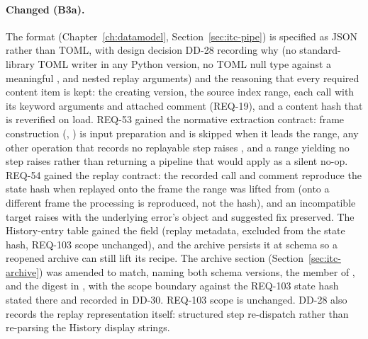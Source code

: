 \paragraph{Changed (B3a).} The  format
(Chapter~\ref{ch:datamodel}, Section~\ref{sec:itc-pipe}) is specified as JSON rather
than TOML, with design decision DD-28 recording why (no
standard-library TOML writer in any Python version, no TOML null type
against a meaningful , and nested replay
arguments) and the reasoning that every required content item is kept:
the creating version, the source index range, each call with its
keyword arguments and attached comment (REQ-19), and a content hash
that is reverified on load. REQ-53 gained the normative extraction
contract: frame construction (, ) is input
preparation and is skipped when it leads the range, any other
operation that records no replayable step raises
, and a range yielding no step raises
rather than returning a pipeline that would apply as a silent no-op.
REQ-54 gained the replay contract: the recorded call and comment
reproduce the state hash when replayed onto the frame the range was
lifted from (onto a different frame the processing is reproduced, not
the hash), and an incompatible target raises with the
underlying error's object and suggested fix preserved. The History-entry
table gained the  field (replay metadata, excluded from the
state hash, REQ-103 scope unchanged), and the  archive
persists it at schema  so a reopened archive can still
lift its recipe. The archive section (Section~\ref{sec:itc-archive}) was
amended to match, naming both schema versions, the  member of
, and the  digest in
, with the scope boundary against the REQ-103 state
hash stated there and recorded in DD-30. REQ-103 scope is unchanged.
DD-28 also records the replay representation itself:
structured step re-dispatch rather than re-parsing the History display
strings.

